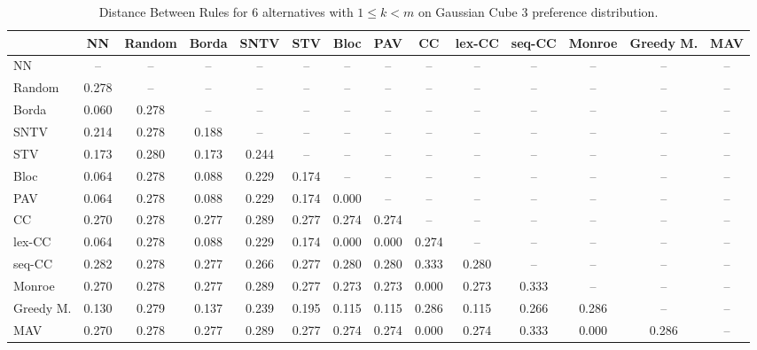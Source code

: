 
\begin{table*}
\centering
\begin{tabular}{lccccccccccccc}
\toprule
 & NN & Random & Borda & SNTV & STV & Bloc & PAV & CC & lex-CC & seq-CC & Monroe & Greedy M. & MAV \\
\midrule
NN & -- & -- & -- & -- & -- & -- & -- & -- & -- & -- & -- & -- & -- \\
Random & 0.278 & -- & -- & -- & -- & -- & -- & -- & -- & -- & -- & -- & -- \\
Borda & 0.060 & 0.278 & -- & -- & -- & -- & -- & -- & -- & -- & -- & -- & -- \\
SNTV & 0.214 & 0.278 & 0.188 & -- & -- & -- & -- & -- & -- & -- & -- & -- & -- \\
STV & 0.173 & 0.280 & 0.173 & 0.244 & -- & -- & -- & -- & -- & -- & -- & -- & -- \\
Bloc & 0.064 & 0.278 & 0.088 & 0.229 & 0.174 & -- & -- & -- & -- & -- & -- & -- & -- \\
PAV & 0.064 & 0.278 & 0.088 & 0.229 & 0.174 & 0.000 & -- & -- & -- & -- & -- & -- & -- \\
CC & 0.270 & 0.278 & 0.277 & 0.289 & 0.277 & 0.274 & 0.274 & -- & -- & -- & -- & -- & -- \\
lex-CC & 0.064 & 0.278 & 0.088 & 0.229 & 0.174 & 0.000 & 0.000 & 0.274 & -- & -- & -- & -- & -- \\
seq-CC & 0.282 & 0.278 & 0.277 & 0.266 & 0.277 & 0.280 & 0.280 & 0.333 & 0.280 & -- & -- & -- & -- \\
Monroe & 0.270 & 0.278 & 0.277 & 0.289 & 0.277 & 0.273 & 0.273 & 0.000 & 0.273 & 0.333 & -- & -- & -- \\
Greedy M. & 0.130 & 0.279 & 0.137 & 0.239 & 0.195 & 0.115 & 0.115 & 0.286 & 0.115 & 0.266 & 0.286 & -- & -- \\
MAV & 0.270 & 0.278 & 0.277 & 0.289 & 0.277 & 0.274 & 0.274 & 0.000 & 0.274 & 0.333 & 0.000 & 0.286 & -- \\
\bottomrule
\end{tabular}

\caption{Distance Between Rules for 6 alternatives with $1 \leq k < m$ on Gaussian Cube 3 preference distribution.}
\end{table*}
